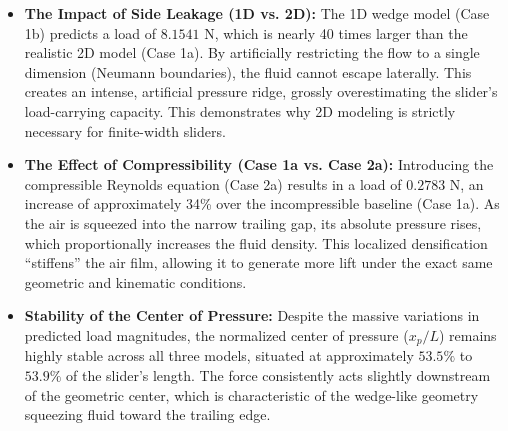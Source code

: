 \documentclass{article}
\begin{document}
\begin{itemize}
    \item \textbf{The Impact of Side Leakage (1D vs. 2D):} 
    The 1D wedge model (Case 1b) predicts a load of $8.1541$ N, which is nearly 40 times larger than the realistic 2D model (Case 1a). By artificially restricting the flow to a single dimension (Neumann boundaries), the fluid cannot escape laterally. This creates an intense, artificial pressure ridge, grossly overestimating the slider's load-carrying capacity. This demonstrates why 2D modeling is strictly necessary for finite-width sliders.
    
    \item \textbf{The Effect of Compressibility (Case 1a vs. Case 2a):} 
    Introducing the compressible Reynolds equation (Case 2a) results in a load of $0.2783$ N, an increase of approximately 34\% over the incompressible baseline (Case 1a). As the air is squeezed into the narrow trailing gap, its absolute pressure rises, which proportionally increases the fluid density. This localized densification ``stiffens'' the air film, allowing it to generate more lift under the exact same geometric and kinematic conditions.
    
    \item \textbf{Stability of the Center of Pressure:} 
    Despite the massive variations in predicted load magnitudes, the normalized center of pressure ($x_p/L$) remains highly stable across all three models, situated at approximately $53.5\%$ to $53.9\%$ of the slider's length. The force consistently acts slightly downstream of the geometric center, which is characteristic of the wedge-like geometry squeezing fluid toward the trailing edge. 
\end{itemize}
\end{document}
